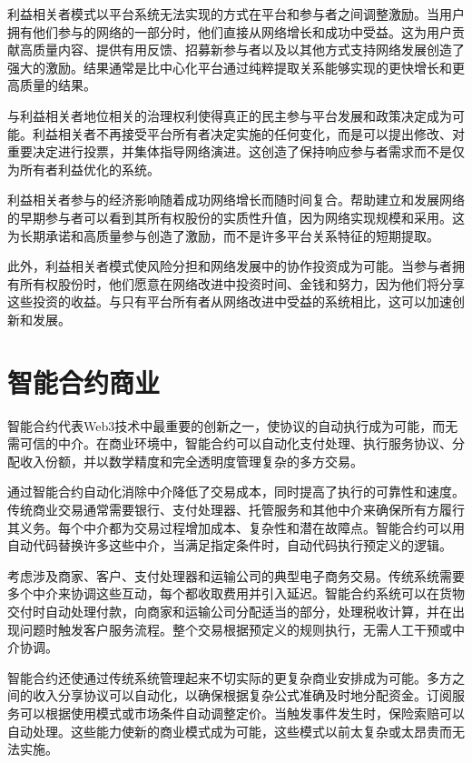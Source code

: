\documentclass[
  Letterpaper,
]{scrbook}
\begin{document}
利益相关者模式以平台系统无法实现的方式在平台和参与者之间调整激励。当用户拥有他们参与的网络的一部分时，他们直接从网络增长和成功中受益。这为用户贡献高质量内容、提供有用反馈、招募新参与者以及以其他方式支持网络发展创造了强大的激励。结果通常是比中心化平台通过纯粹提取关系能够实现的更快增长和更高质量的结果。

与利益相关者地位相关的治理权利使得真正的民主参与平台发展和政策决定成为可能。利益相关者不再接受平台所有者决定实施的任何变化，而是可以提出修改、对重要决定进行投票，并集体指导网络演进。这创造了保持响应参与者需求而不是仅为所有者利益优化的系统。

利益相关者参与的经济影响随着成功网络增长而随时间复合。帮助建立和发展网络的早期参与者可以看到其所有权股份的实质性升值，因为网络实现规模和采用。这为长期承诺和高质量参与创造了激励，而不是许多平台关系特征的短期提取。

此外，利益相关者模式使风险分担和网络发展中的协作投资成为可能。当参与者拥有所有权股份时，他们愿意在网络改进中投资时间、金钱和努力，因为他们将分享这些投资的收益。与只有平台所有者从网络改进中受益的系统相比，这可以加速创新和发展。

\section{智能合约商业}\label{ux667aux80fdux5408ux7ea6ux5546ux4e1a}

智能合约代表Web3技术中最重要的创新之一，使协议的自动执行成为可能，而无需可信的中介。在商业环境中，智能合约可以自动化支付处理、执行服务协议、分配收入份额，并以数学精度和完全透明度管理复杂的多方交易。

通过智能合约自动化消除中介降低了交易成本，同时提高了执行的可靠性和速度。传统商业交易通常需要银行、支付处理器、托管服务和其他中介来确保所有方履行其义务。每个中介都为交易过程增加成本、复杂性和潜在故障点。智能合约可以用自动代码替换许多这些中介，当满足指定条件时，自动代码执行预定义的逻辑。

考虑涉及商家、客户、支付处理器和运输公司的典型电子商务交易。传统系统需要多个中介来协调这些互动，每个都收取费用并引入延迟。智能合约系统可以在货物交付时自动处理付款，向商家和运输公司分配适当的部分，处理税收计算，并在出现问题时触发客户服务流程。整个交易根据预定义的规则执行，无需人工干预或中介协调。

智能合约还使通过传统系统管理起来不切实际的更复杂商业安排成为可能。多方之间的收入分享协议可以自动化，以确保根据复杂公式准确及时地分配资金。订阅服务可以根据使用模式或市场条件自动调整定价。当触发事件发生时，保险索赔可以自动处理。这些能力使新的商业模式成为可能，这些模式以前太复杂或太昂贵而无法实施。
\end{document}
